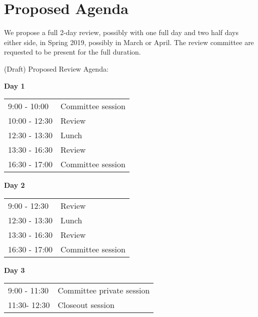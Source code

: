 \documentclass[DM,lsstdraft,STS,toc]{lsstdoc}
\begin{document}
\section{Proposed Agenda}
We propose a full 2-day review, possibly with one full day and two half days either side, in Spring 2019, possibly in March or April.
The review committee are requested to be present for the full duration.

(Draft) Proposed Review Agenda:

\textbf{Day 1} \\
\begin{tabular}[htb]{l l}
9:00 - 10:00 & Committee session \\
10:00 - 12:30 & Review \\
12:30 - 13:30 & Lunch \\
13:30 - 16:30 & Review \\
16:30 - 17:00 & Committee session \\
\end{tabular}

\textbf{Day 2} \\
\begin{tabular}[htb]{l l}
9:00 - 12:30 & Review \\
12:30 - 13:30 & Lunch \\
13:30 - 16:30 & Review \\
16:30 - 17:00 & Committee session \\
\end{tabular}

\textbf{Day 3} \\
\begin{tabular}[htb]{l l}
9:00 - 11:30 & Committee private session \\
11:30- 12:30 & Closeout session\\
\end{tabular}

\clearpage
\end{document}
